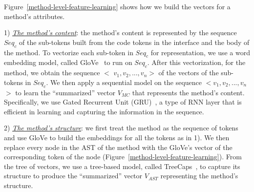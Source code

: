 Figure~\ref{method-level-feature-learning} shows how we build the
vectors for a method's attributes.


1) {\em \underline{The method's content}}: the method's content is
represented by the sequence $Seq_c$ of the sub-tokens built from the
code tokens in the interface and the body of the method. To vectorize
each sub-token in $Seq_c$ for representation, we use a word embedding
model, called GloVe~\cite{glove2014} to run on $Seq_c$. After this
vectorization, for the method, we obtain the sequence $<$ $v_1, v_2,
..., v_n$$>$ of the vectors of the sub-tokens in $Seq_c$.  We then
apply a sequential model on the sequence $<$$v_1,v_2,...,v_n$$>$ to
learn the ``summarized'' vector $V_{MC}$ that represents the method's
content. Specifically, we use Gated Recurrent Unit
(GRU)~\cite{cho2014learning}, a type of RNN layer that is efficient in
learning and capturing the information in the sequence.


2) {\em \underline{The method's structure}}: we first treat the
method as the sequence of tokens and use GloVe to build
the embeddings for all the tokens as in 1). We then replace every node
in the AST of the method with the GloVe's vector of the corresponding
token of the node (Figure~\ref{method-level-feature-learning}).  From
the tree of vectors, we use a tree-based model, called
TreeCaps~\cite{bui2021treecaps}, to capture its structure to
produce the ``summarized'' vector $V_{AST}$ representing the
method's structure.


